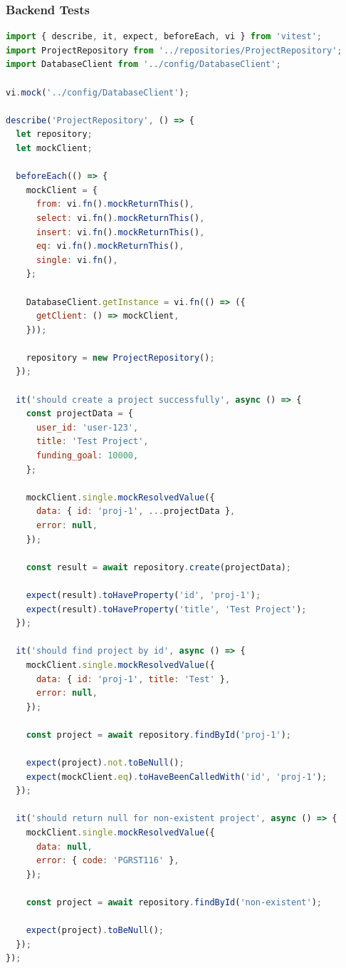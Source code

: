 \documentclass[12pt,a4paper]{article}
\begin{document}
\subsubsection{Backend Tests}
\begin{lstlisting}[language=JavaScript, caption=ProjectRepository.test.js]
import { describe, it, expect, beforeEach, vi } from 'vitest';
import ProjectRepository from '../repositories/ProjectRepository';
import DatabaseClient from '../config/DatabaseClient';

vi.mock('../config/DatabaseClient');

describe('ProjectRepository', () => {
  let repository;
  let mockClient;

  beforeEach(() => {
    mockClient = {
      from: vi.fn().mockReturnThis(),
      select: vi.fn().mockReturnThis(),
      insert: vi.fn().mockReturnThis(),
      eq: vi.fn().mockReturnThis(),
      single: vi.fn(),
    };

    DatabaseClient.getInstance = vi.fn(() => ({
      getClient: () => mockClient,
    }));

    repository = new ProjectRepository();
  });

  it('should create a project successfully', async () => {
    const projectData = {
      user_id: 'user-123',
      title: 'Test Project',
      funding_goal: 10000,
    };

    mockClient.single.mockResolvedValue({
      data: { id: 'proj-1', ...projectData },
      error: null,
    });

    const result = await repository.create(projectData);

    expect(result).toHaveProperty('id', 'proj-1');
    expect(result).toHaveProperty('title', 'Test Project');
  });

  it('should find project by id', async () => {
    mockClient.single.mockResolvedValue({
      data: { id: 'proj-1', title: 'Test' },
      error: null,
    });

    const project = await repository.findById('proj-1');

    expect(project).not.toBeNull();
    expect(mockClient.eq).toHaveBeenCalledWith('id', 'proj-1');
  });

  it('should return null for non-existent project', async () => {
    mockClient.single.mockResolvedValue({
      data: null,
      error: { code: 'PGRST116' },
    });

    const project = await repository.findById('non-existent');

    expect(project).toBeNull();
  });
});
\end{lstlisting}
\end{document}
